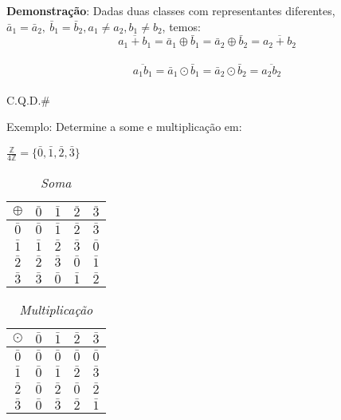 \textbf{Demonstra{\c c}{\~a}o}: Dadas duas classes com representantes diferentes, $\bar{a}_{1}=\bar{a}_{2},\  \bar{b}_{1}=\bar{b}_{2}, a_{1}\ne a_{2}, b_{1}\ne b_{2}$, temos:\\
\[\overline{a_{1}+b_{1}}=\bar{a}_{1}\oplus\bar{b}_{1}=\bar{a}_{2}\oplus\bar{b}_{2}=\overline{a_{2}+b_{2}}\]\\
\[\overline{a_{1}b_{1}}=\bar{a}_{1}\odot\bar{b}_{1}=\bar{a}_{2}\odot\bar{b}_{2}=\overline{a_{2}b_{2}}\]\\

C.Q.D.\#

Exemplo: Determine a some e multiplica{\c c}{\~a}o em:

$\displaystyle\frac{\mathbb{Z}}{4\mathbb{Z}}=\{\bar{0},\bar{1},\bar{2},\bar{3}\}$
\begin{table}[h]
   \centering 
   \setlength{\arrayrulewidth}{0,5\arrayrulewidth}
   \caption{\it Soma}
   \begin{tabular}{|c|c|c|c|c|} 
      \hline
      $\oplus$ & $\bar{0}$ & $\bar{1}$ & $\bar{2}$ & $\bar{3}$ \\
      \hline
      $\bar{0}$ & $\bar{0}$ & $\bar{1}$ & $\bar{2}$ & $\bar{3}$ \\
      \hline
      $\bar{1}$ & $\bar{1}$ & $\bar{2}$ & $\bar{3}$ & $\bar{0}$ \\
      \hline
      $\bar{2}$ & $\bar{2}$ & $\bar{3}$ & $\bar{0}$ & $\bar{1}$ \\
      \hline
      $\bar{3}$ & $\bar{3}$ & $\bar{0}$ & $\bar{1}$ & $\bar{2}$ \\
      \hline
   \end{tabular}
\end{table}

\begin{table}[h]
   \centering 
   \setlength{\arrayrulewidth}{0,5\arrayrulewidth}
   \caption{\it Multiplica{\c c}{\~a}o}
   \begin{tabular}{|c|c|c|c|c|} 
      \hline
      $\odot$ & $\bar{0}$ & $\bar{1}$ & $\bar{2}$ & $\bar{3}$ \\
      \hline
      $\bar{0}$ & $\bar{0}$ & $\bar{0}$ & $\bar{0}$ & $\bar{0}$ \\
      \hline
      $\bar{1}$ & $\bar{0}$ & $\bar{1}$ & $\bar{2}$ & $\bar{3}$ \\
      \hline
      $\bar{2}$ & $\bar{0}$ & $\bar{2}$ & $\bar{0}$ & $\bar{2}$ \\
      \hline
      $\bar{3}$ & $\bar{0}$ & $\bar{3}$ & $\bar{2}$ & $\bar{1}$ \\
      \hline
   \end{tabular}
\end{table}


